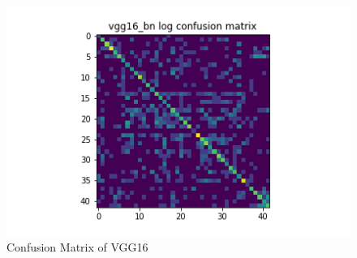 \begin{figure}[t]
\begin{minipage}[b]{.5\linewidth}
  \end{minipage}
  \hfill
  \begin{minipage}[b]{.5\linewidth}
    \centering
    \includegraphics[width=1.2\textwidth]{figs/conf_matrix/vgg16_bn_log_conf.png}
  \end{minipage}

  \caption{Confusion Matrix of VGG16}
  \label{fig:vgg16_conf}
\end{figure}

